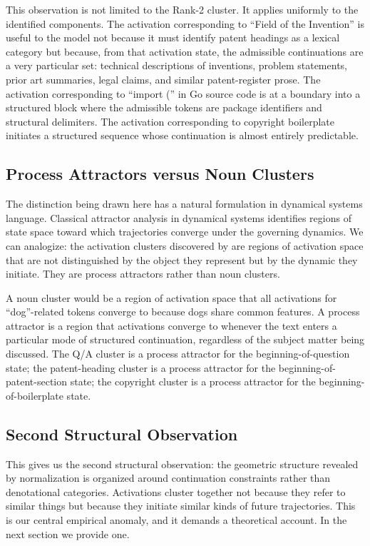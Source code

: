 \documentclass[12pt, a4paper]{article}
\theoremstyle{plain}
\theoremstyle{definition}
\theoremstyle{remark}
\begin{document}
This observation is not limited to the Rank-2 cluster. It applies uniformly
to the identified components. The activation corresponding to ``Field of the
Invention'' is useful to the model not because it must identify patent headings
as a lexical category but because, from that activation state, the admissible
continuations are a very particular set: technical descriptions of inventions,
problem statements, prior art summaries, legal claims, and similar
patent-register prose. The activation corresponding to ``import ('' in Go
source code is at a boundary into a structured block where the admissible
tokens are package identifiers and structural delimiters. The activation
corresponding to copyright boilerplate initiates a structured sequence whose
continuation is almost entirely predictable.

\subsection{Process Attractors versus Noun Clusters}

The distinction being drawn here has a natural formulation in dynamical systems
language. Classical attractor analysis in dynamical systems identifies regions
of state space toward which trajectories converge under the governing dynamics.
We can analogize: the activation clusters discovered by \cite{liu2026normgeometry}
are regions of activation space that are not distinguished by the object they
represent but by the dynamic they initiate. They are process attractors rather
than noun clusters.

A noun cluster would be a region of activation space that all activations for
``dog''-related tokens converge to because dogs share common features. A
process attractor is a region that activations converge to whenever the text
enters a particular mode of structured continuation, regardless of the
subject matter being discussed. The Q/A cluster is a process attractor for the
beginning-of-question state; the patent-heading cluster is a process attractor
for the beginning-of-patent-section state; the copyright cluster is a process
attractor for the beginning-of-boilerplate state.

\subsection{Second Structural Observation}

This gives us the second structural observation: the geometric structure
revealed by normalization is organized around continuation constraints rather
than denotational categories. Activations cluster together not because they
refer to similar things but because they initiate similar kinds of future
trajectories. This is our central empirical anomaly, and it demands a
theoretical account. In the next section we provide one.
\end{document}
